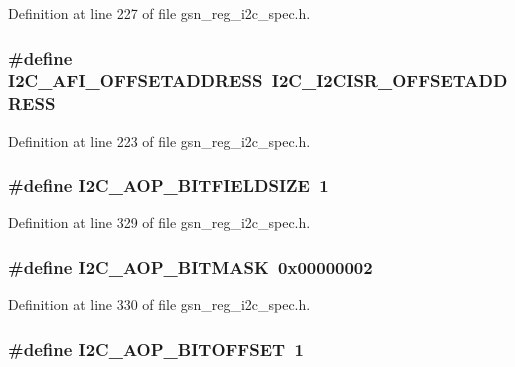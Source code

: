 Definition at line 227 of file gsn\_\-reg\_\-i2c\_\-spec.h.

\hypertarget{a00558_ab95593af0244945884376d1e24489df0}{
\subsubsection[{I2C\_\-AFI\_\-OFFSETADDRESS}]{\setlength{\rightskip}{0pt plus 5cm}\#define I2C\_\-AFI\_\-OFFSETADDRESS~I2C\_\-I2CISR\_\-OFFSETADDRESS}}
\label{a00558_ab95593af0244945884376d1e24489df0}


Definition at line 223 of file gsn\_\-reg\_\-i2c\_\-spec.h.

\hypertarget{a00558_abcd3ada0fb9e296e674e9387a32d9d8a}{
\subsubsection[{I2C\_\-AOP\_\-BITFIELDSIZE}]{\setlength{\rightskip}{0pt plus 5cm}\#define I2C\_\-AOP\_\-BITFIELDSIZE~1}}
\label{a00558_abcd3ada0fb9e296e674e9387a32d9d8a}


Definition at line 329 of file gsn\_\-reg\_\-i2c\_\-spec.h.

\hypertarget{a00558_a37fb7dbbd7b8620bb4fadd1933b4ae75}{
\subsubsection[{I2C\_\-AOP\_\-BITMASK}]{\setlength{\rightskip}{0pt plus 5cm}\#define I2C\_\-AOP\_\-BITMASK~0x00000002}}
\label{a00558_a37fb7dbbd7b8620bb4fadd1933b4ae75}


Definition at line 330 of file gsn\_\-reg\_\-i2c\_\-spec.h.

\hypertarget{a00558_afc6f37f25e42af36c0cfcc0bad383a9e}{
\subsubsection[{I2C\_\-AOP\_\-BITOFFSET}]{\setlength{\rightskip}{0pt plus 5cm}\#define I2C\_\-AOP\_\-BITOFFSET~1}}
\label{a00558_afc6f37f25e42af36c0cfcc0bad383a9e}


